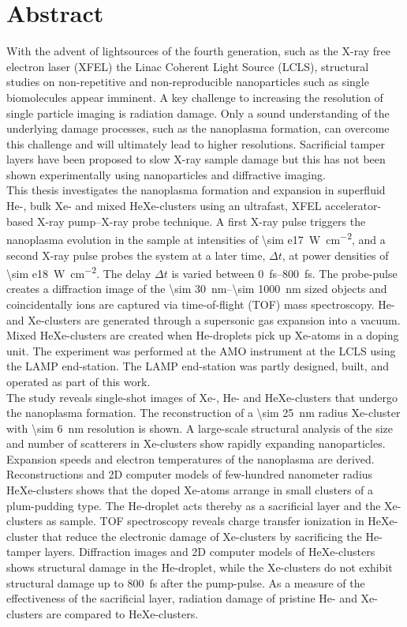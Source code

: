 \section*{Abstract}\label{ch:abstract}
With the advent of lightsources of the fourth generation, such as the X-ray free electron laser (XFEL) the Linac Coherent Light Source (LCLS), structural studies on non-repetitive and non-reproducible nanoparticles such as single biomolecules appear imminent. A key challenge to increasing the resolution of single particle imaging is radiation damage. Only a sound understanding of the underlying damage processes, such as the nanoplasma formation, can overcome this challenge and will ultimately lead to higher resolutions. Sacrificial tamper layers have been proposed to slow X-ray sample damage but this has not been shown experimentally using nanoparticles and diffractive imaging.\\[0.5\baselineskip]
%
This thesis investigates the nanoplasma formation and expansion in superfluid He-, bulk Xe- and mixed HeXe-clusters using an ultrafast, XFEL accelerator-based X-ray pump--X-ray probe technique. A first X-ray pulse triggers the nanoplasma evolution in the sample at intensities of \SI{\sim e17}{\watt\per\square\centi\meter}, and a second X-ray pulse probes the system at a later time, $\Delta t$, at power densities of \SI{\sim e18}{\watt\per\square\centi\meter}. The delay $\Delta t$ is varied between \SIrange{0}{800}{\femto\second}. The probe-pulse creates a diffraction image of the \SIrange{\sim 30}{\sim 1000}{\nano\meter} sized objects and coincidentally ions are captured via time-of-flight (TOF) mass spectroscopy. He- and Xe-clusters are generated through a supersonic gas expansion into a vacuum. Mixed HeXe-clusters are created when He-droplets pick up Xe-atoms in a doping unit. The experiment was performed at the AMO instrument at the LCLS using the LAMP end-station. The LAMP end-station was partly designed, built, and operated as part of this work.\\[0.5\baselineskip]
%
The study reveals single-shot images of Xe-, He- and HeXe-clusters that undergo the nanoplasma formation. The reconstruction of a \SI{\sim 25}{\nano\meter} radius Xe-cluster with \SI{\sim 6}{\nano\meter} resolution is shown. A large-scale structural analysis of the size and number of scatterers in Xe-clusters show rapidly expanding nanoparticles. Expansion speeds and electron temperatures of the nanoplasma are derived. Reconstructions and 2D computer models of few-hundred nanometer radius HeXe-clusters shows that the doped Xe-atoms arrange in small clusters of a plum-pudding type. The He-droplet acts thereby as a sacrificial layer and the Xe-clusters as sample. TOF spectroscopy reveals charge transfer ionization in HeXe-cluster that reduce the electronic damage of Xe-clusters by sacrificing the He-tamper layers. Diffraction images and 2D computer models of HeXe-clusters shows structural damage in the He-droplet, while the Xe-clusters do not exhibit structural damage up to \SI{800}{\femto\second} after the pump-pulse. As a measure of the effectiveness of the sacrificial layer, radiation damage of pristine He- and Xe-clusters are compared to HeXe-clusters.
%
%
%
%